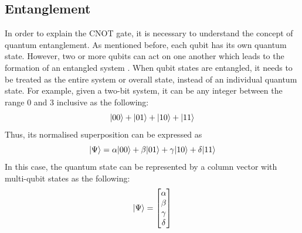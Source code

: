 \documentclass[12pt]{third-rep}
\begin{document}
\subsection{Entanglement}
In order to explain the CNOT gate, it is necessary to understand the concept of quantum entanglement. As mentioned before, each qubit has its own quantum state. However, two or more qubits can act on one another which leads to the formation of an entangled system \cite{entangle}. When qubit states are entangled, it needs to be treated as the entire system or overall state, instead of an individual quantum state. For example, given a two-bit system, it can be any integer between the range 0 and 3 inclusive as the following:
$${\left\vert{00}\right\rangle}+{\left\vert{01}\right\rangle}+{\left\vert{10}\right\rangle}+{\left\vert{11}\right\rangle}$$
Thus, its normalised superposition can be expressed as
$${\left\vert{\Psi}\right\rangle}=\alpha{\left\vert{00}\right\rangle}+\beta{\left\vert{01}\right\rangle}+\gamma{\left\vert{10}\right\rangle}+\delta{\left\vert{11}\right\rangle}$$
In this case, the quantum state can be represented by a column vector with multi-qubit states as the following:
\[
 {\left\vert{\Psi}\right\rangle}=
\begin{bmatrix}
    \alpha \\
    \beta \\
    \gamma \\
    \delta
\end{bmatrix}
\]
\end{document}
